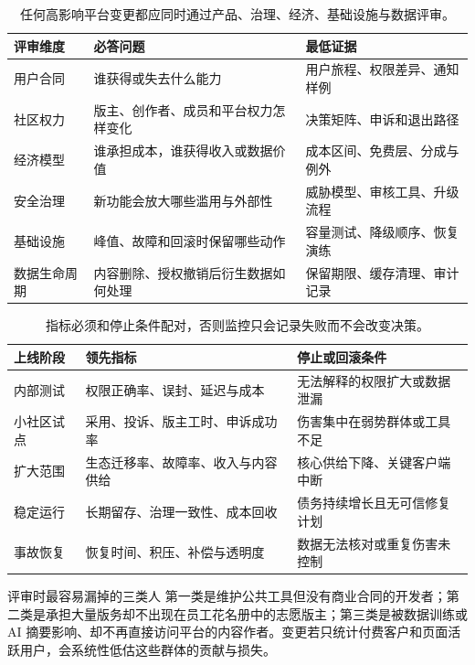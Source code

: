 \documentclass[a4paper]{article}
\begin{document}
\begin{table}[H]
\centering
\begin{tabular}{L{0.18\textwidth}L{0.33\textwidth}L{0.39\textwidth}}
\toprule
评审维度 & 必答问题 & 最低证据 \\
\midrule
用户合同 & 谁获得或失去什么能力 & 用户旅程、权限差异、通知样例 \\
社区权力 & 版主、创作者、成员和平台权力怎样变化 & 决策矩阵、申诉和退出路径 \\
经济模型 & 谁承担成本，谁获得收入或数据价值 & 成本区间、免费层、分成与例外 \\
安全治理 & 新功能会放大哪些滥用与外部性 & 威胁模型、审核工具、升级流程 \\
基础设施 & 峰值、故障和回滚时保留哪些动作 & 容量测试、降级顺序、恢复演练 \\
数据生命周期 & 内容删除、授权撤销后衍生数据如何处理 & 保留期限、缓存清理、审计记录 \\
\bottomrule
\end{tabular}
\caption{任何高影响平台变更都应同时通过产品、治理、经济、基础设施与数据评审。}
\end{table}

\begin{table}[H]
\centering
\begin{tabular}{L{0.2\textwidth}L{0.32\textwidth}L{0.38\textwidth}}
\toprule
上线阶段 & 领先指标 & 停止或回滚条件 \\
\midrule
内部测试 & 权限正确率、误封、延迟与成本 & 无法解释的权限扩大或数据泄漏 \\
小社区试点 & 采用、投诉、版主工时、申诉成功率 & 伤害集中在弱势群体或工具不足 \\
扩大范围 & 生态迁移率、故障率、收入与内容供给 & 核心供给下降、关键客户端中断 \\
稳定运行 & 长期留存、治理一致性、成本回收 & 债务持续增长且无可信修复计划 \\
事故恢复 & 恢复时间、积压、补偿与透明度 & 数据无法核对或重复伤害未控制 \\
\bottomrule
\end{tabular}
\caption{指标必须和停止条件配对，否则监控只会记录失败而不会改变决策。}
\end{table}

\begin{warningbox}{评审时最容易漏掉的三类人}
第一类是维护公共工具但没有商业合同的开发者；第二类是承担大量版务却不出现在员工花名册中的志愿版主；第三类是被数据训练或 AI 摘要影响、却不再直接访问平台的内容作者。变更若只统计付费客户和页面活跃用户，会系统性低估这些群体的贡献与损失。
\end{warningbox}
\end{document}
